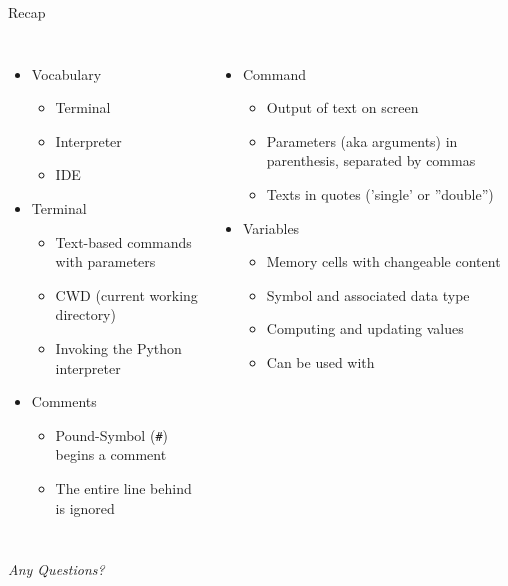 
\begin{frame}[t,plain]
\titlepage
\end{frame}


\begin{frame}{Recap}
%
\begin{columns}[T]
\begin{itemize}
\item Vocabulary
	\begin{itemize}
	\item Terminal
	\item Interpreter
	\item IDE
	\end{itemize}
\item Terminal
	\begin{itemize}
	\item Text-based commands with parameters
	\item CWD (current working directory)
	\item Invoking the Python interpreter
	\end{itemize}
\item Comments
	\begin{itemize}
	\item Pound-Symbol (\texttt{\#}) begins a comment
	\item The entire line behind is ignored
	\end{itemize}
\end{itemize}
%
\begin{itemize}
\item Command 
	\begin{itemize}
	\item Output of text on screen
	\item Parameters (aka arguments) in parenthesis, separated by commas
	\item Texts in quotes ('single' or ''double'')
	\end{itemize}
\item Variables
	\begin{itemize}
	\item Memory cells with changeable content
	\item Symbol and associated data type
	\item Computing and updating values
	\item Can be used with 
	\end{itemize}
\end{itemize}
\end{columns}
%
\begin{center}
	\emph{Any Questions?}
\end{center}
%
\end{frame}


